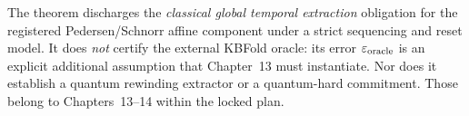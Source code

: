 \begin{remark}
The theorem discharges the
\emph{classical global temporal
extraction} obligation for the
registered Pedersen/Schnorr
affine component under a strict
sequencing and reset model.
It does \emph{not} certify the
external KBFold oracle: its
error $\varepsilon_{\rm oracle}$
is an explicit additional
assumption that Chapter~13
must instantiate. Nor does it
establish a quantum rewinding
extractor or a quantum-hard
commitment. Those belong to
Chapters~13--14 within the
locked plan.
\end{remark}
